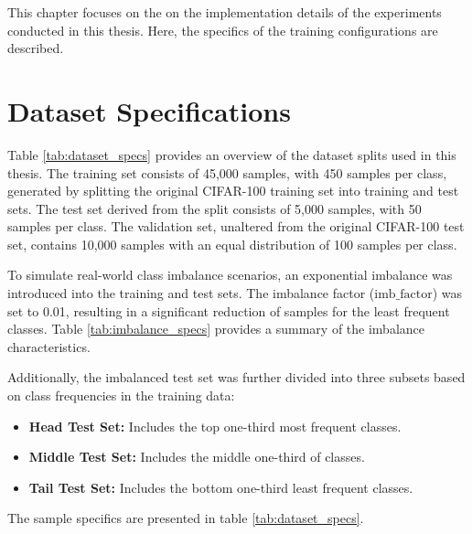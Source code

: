 
This chapter focuses on the on the implementation details of the experiments conducted in this thesis. Here, the specifics of the training configurations are described. 

\section{Dataset Specifications}
Table \ref{tab:dataset_specs} provides an overview of the dataset splits used in this thesis. The training set consists of 45,000 samples, with 450 samples per class, generated by splitting the original CIFAR-100 training set into training and test sets. The test set derived from the split consists of 5,000 samples, with 50 samples per class. The validation set, unaltered from the original CIFAR-100 test set, contains 10,000 samples with an equal distribution of 100 samples per class.

To simulate real-world class imbalance scenarios, an exponential imbalance was introduced into the training and test sets. The imbalance factor (\(\text{imb\_factor}\)) was set to 0.01, resulting in a significant reduction of samples for the least frequent classes. Table \ref{tab:imbalance_specs} provides a summary of the imbalance characteristics.

Additionally, the imbalanced test set was further divided into three subsets based on class frequencies in the training data:

\begin{itemize}
    \item \textbf{Head Test Set:} Includes the top one-third most frequent classes.
    \item \textbf{Middle Test Set:} Includes the middle one-third of classes.
    \item \textbf{Tail Test Set:} Includes the bottom one-third least frequent classes.
\end{itemize}

The sample specifics are presented in table \ref{tab:dataset_specs}.



